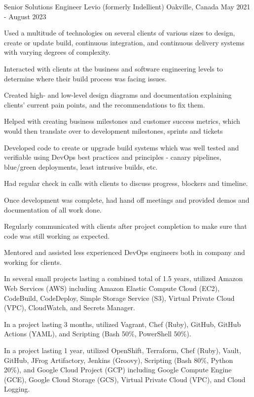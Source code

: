 \begin{cventries}
  \cventry
    {Senior Solutions Engineer} %
    {Levio (formerly Indellient)} %
    {Oakville, Canada} %
    {May 2021 - August 2023} %
    {
      \begin{cvitems} %
        \item {Used a multitude of technologies on several clients of various sizes to design, create or update build, continuous integration, and continuous delivery systems with varying degrees of complexity.}
        \item {Interacted with clients at the business and software engineering levels to determine where their build process was facing issues.}
        \item {Created high- and low-level design diagrams and documentation explaining clients' current pain points, and the recommendations to fix them.}
        \item {Helped with creating business milestones and customer success metrics, which would then translate over to development milestones, sprints and tickets}
        \item {Developed code to create or upgrade build systems which was well tested and verifiable using DevOps best practices and principles - canary pipelines, blue/green deployments, least intrusive builds, etc.}
        \item {Had regular check in calls with clients to discuss progress, blockers and timeline.}
        \item {Once development was complete, had hand off meetings and provided demos and documentation of all work done.}
        \item {Regularly communicated with clients after project completion to make sure that code was still working as expected.}
        \item {Mentored and assisted less experienced DevOps engineers both in company and working for clients.}
        \item {In several small projects lasting a combined total of 1.5 years, utilized Amazon Web Services (AWS) including Amazon Elastic Compute Cloud (EC2), CodeBuild, CodeDeploy, Simple Storage Service (S3), Virtual Private Cloud (VPC), CloudWatch, and Secrets Manager.}
        \item {In a project lasting 3 months, utilized Vagrant, Chef (Ruby), GitHub, GitHub Actions (YAML), and Scripting (Bash 50\%, PowerShell 50\%).}
        \item {In a project lasting 1 year, utilized OpenShift, Terraform, Chef (Ruby), Vault, GitHub, JFrog Artifactory, Jenkins (Groovy), Scripting (Bash 80\%, Python 20\%), and Google Cloud Project (GCP) including Google Compute Engine (GCE), Google Cloud Storage (GCS), Virtual Private Cloud (VPC), and Cloud Logging.}

\end{cvitems}}
\end{cventries}
